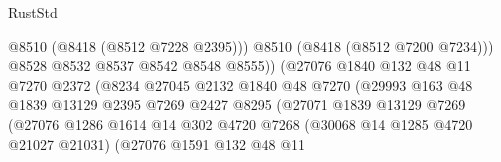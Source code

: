 \begin{lexlean}{RustStd}
\begin{coremodule}
                                                @8510
                                                (@8418 (@8512 @7228 @2395)))
                                              @8510
                                              (@8418 (@8512 @7200 @7234)))
                                            @8528
                                            @8532
                                            @8537
                                            @8542
                                            @8548
                                            @8555))
                                        (@27076
                                          @1840
                                          @132
                                          @48
                                          @11
                                          @7270
                                          @2372
                                          (@8234
                                            @27045
                                            @2132
                                            @1840
                                            @48
                                            @7270
                                            (@29993
                                              @163
                                              @48
                                              @1839
                                              @13129
                                              @2395
                                              @7269
                                              @2427
                                              @8295
                                              (@27071
                                                @1839
                                                @13129
                                                @7269
                                                (@27076
                                                  @1286
                                                  @1614
                                                  @14
                                                  @302
                                                  @4720
                                                  @7268
                                                  (@30068 @14 @1285 @4720 @21027 @21031)
                                                  (@27076
                                                    @1591
                                                    @132
                                                    @48
                                                    @11

\end{coremodule}
\end{lexlean}
